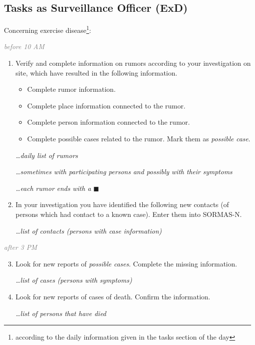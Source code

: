 \documentclass[a4paper, titlepage]{tufte-handout}
\begin{document}
\subsection{Tasks as Surveillance Officer (ExD)}
\label{sec-4-2}

Concerning exercise disease\footnote{according to the daily information given in the tasks section of the day}:

\emph{\textcolor{gray}{before 10 AM}}

\begin{enumerate}
\item Verify and complete information on rumors according to your investigation on site, which have resulted in the following information.

\begin{itemize}
\item Complete rumor information.

\item Complete place information connected to the rumor.

\item Complete person information connected to the rumor.

\item Complete possible cases related to the rumor. Mark them as \emph{possible case}.
\end{itemize}

\emph{\ldots daily list of rumors}

\emph{\ldots sometimes with participating persons and possibly with their symptoms}

\emph{\ldots each rumor ends with a $\blacksquare$}

\item In your investigation you have identified the following new contacts (of persons which had contact to a known case). Enter them into SORMAS-N.

\emph{\ldots list of contacts (persons with case information)}
\end{enumerate}

\emph{\textcolor{gray}{after 3 PM}}

\begin{enumerate}
\setcounter{enumi}{2}
\item Look for new reports of \emph{possible cases}. Complete the missing information. 

\emph{\ldots list of cases (persons with symptoms)}

\item Look for new reports of cases of death. Confirm the information.

\emph{\ldots list of persons that have died}
\end{enumerate}
\end{document}
